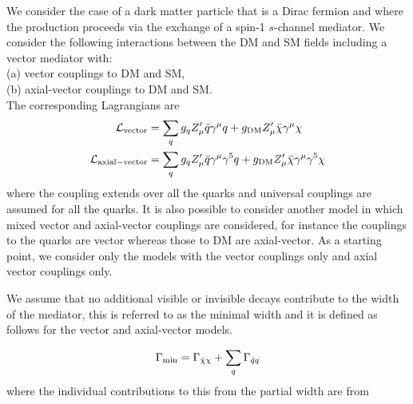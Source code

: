 We consider the case of a dark matter particle that is a Dirac fermion and where the production proceeds via the exchange of a spin-1 $s$-channel mediator. We consider the following interactions between the DM and SM fields including a vector mediator with:\\
(a) vector couplings to DM and SM,\\
(b) axial-vector couplings to DM and SM.\\
\noindent The corresponding Lagrangians are
\begin{align}
\label{eq:AV} 
\mathcal{L}_{\mathrm{vector}} &= \sum_q \gq Z'_{\mu} \bar{q}\gamma^{\mu}q + \gDM Z'_{\mu} \bar{\chi}\gamma^{\mu}\chi \\
\mathcal{L}_{\rm{axial-vector}} &= \sum_q \gq Z'_{\mu} \bar{q}\gamma^{\mu}\gamma^5q + \gDM Z'_{\mu} \bar{\chi}\gamma^{\mu}\gamma^5\chi
\end{align}
where the coupling extends over all the quarks and universal couplings are assumed for all the quarks. 
It is also possible to consider another model in which mixed vector and axial-vector couplings are considered, for instance the couplings to the quarks are vector whereas those to DM are axial-vector. As a starting point, we consider only the models with the vector couplings only and axial vector couplings only.


We assume that no additional visible or invisible decays contribute to the width of the mediator, this is referred to as the minimal width and it is defined as follows for the vector and axial-vector models.

\begin{equation}
\Gamma_{\rm{min}}=\Gamma_{\bar{\chi}\chi} + \sum_{q}\Gamma_{\bar{q}q}
\label{eq:monojet_min}
\end{equation}
where the individual contributions to this from the partial width are from

